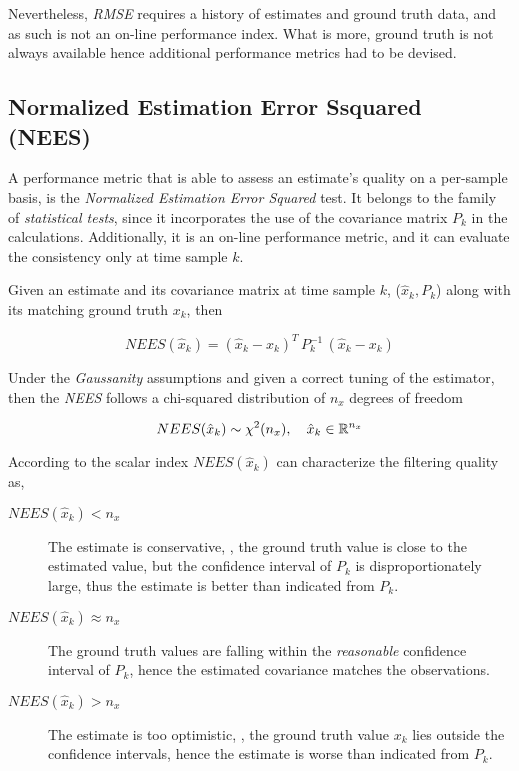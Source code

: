 Nevertheless, \emph{RMSE} requires a history of estimates and ground truth data, and as such is not an on-line performance index. What is more,  ground truth is not always available hence additional performance metrics had to be devised. 

\subsection{Normalized Estimation Error Ssquared (NEES)}
\label{ssec:NEES}
A performance metric that is able to assess an estimate's quality on a per-sample basis, is the \emph{Normalized Estimation Error Squared} test. It belongs to the family of \emph{statistical tests}, since it incorporates the use of the covariance matrix $P_k$ in the calculations. Additionally, it is an on-line performance metric, and it can evaluate the consistency only at time sample $k$.

\begin{framed}
Given an estimate and its covariance matrix at time sample $k$, ($\hat{x}_k, P_k$) along with its matching ground truth $x_k$, then

\begin{equation}\label{eq:NEES}
NEES(\hat{x}_k) =  (\hat{x}_k - x_k)^T \, P_k^{-1} \, (\hat{x}_k - x_k) 
\end{equation}

\end{framed}

Under the \emph{Gaussanity} assumptions and given a correct tuning of the estimator, then the \emph{NEES} follows a chi-squared distribution of $n_x$  degrees of freedom

\begin{equation}\label{key}
NEES(\hat{x}_k) \sim \chi^2(n_x), \quad \hat{x}_k \in {\mathbb{R}}^{n_x}
\end{equation}

According to \cite{TargetTracking} the scalar index $NEES(\hat{x}_k)$ can characterize the filtering quality as,

\begin{description}
	\item[$NEES(\hat{x}_k)< n_x$] The estimate is conservative, \ie, the ground truth value is close to the estimated value, but the confidence interval of $P_k$ is disproportionately large, thus the estimate is better than indicated from $P_k$.
	\item[$NEES(\hat{x}_k) \approx n_x $] The ground truth values are falling within the \emph{reasonable} confidence interval of $P_k$, hence the estimated covariance matches the observations.
	\item[$NEES(\hat{x}_k) > n_x$] The estimate is too optimistic, \ie, the ground truth value $x_k$ lies outside the confidence intervals, hence the estimate is worse than indicated from $P_k$.
\end{description}

